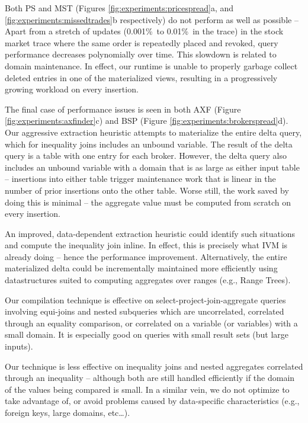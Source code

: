 Both PS and MST (Figures \ref{fig:experiments:pricespread}a, and \ref{fig:experiments:missedtrades}b respectively) do not perform as well as possible -- Apart from a stretch of updates (0.001\%\ to 0.01\%\ in the trace) in the stock market trace where the same order is repeatedly placed and revoked, query performance decreases polynomially over time.  This slowdown is related to domain maintenance.  In effect, our runtime is unable to properly garbage collect deleted entries in one of the materialized views, resulting in a progressively growing workload on every insertion.  

The final case of performance issues is seen in both AXF (Figure \ref{fig:experiments:axfinder}c) and BSP (Figure \ref{fig:experiments:brokerspread}d).  Our aggressive extraction heuristic attempts to materialize the entire delta query, which for inequality joins includes an unbound variable.  The result of the delta query is a table with one entry for each broker.  However, the delta query also includes an unbound variable with a domain that is as large as either input table -- insertions into either table trigger maintenance work that is linear in the number of prior insertions onto the other table.  Worse still, the work saved by doing this is minimal -- the aggregate value must be computed from scratch on every insertion.

An improved, data-dependent extraction heuristic could identify such situations and compute the inequality join inline.  In effect, this is precisely what IVM is already doing -- hence the performance improvement.  Alternatively, the entire materialized delta could be incrementally maintained more efficiently using datastructures suited to computing aggregates over ranges (e.g., Range Trees\cite{range trees}).


Our compilation technique is effective on select-project-join-aggregate queries involving equi-joins and nested subqueries which are uncorrelated, correlated through an equality comparison, or correlated on a variable (or variables) with a small domain.  It is especially good on queries with small result sets (but large inputs).

Our technique is less effective on inequality joins and nested aggregates correlated through an inequality -- although both are still handled efficiently if the domain of the values being compared is small.  In a similar vein, we do not optimize to take advantage of, or avoid problems caused by data-specific characteristics (e.g., foreign keys, large domains, etc\ldots). 


